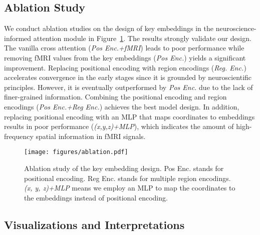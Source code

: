 \subsection{Ablation Study}
We conduct ablation studies on the design of key embeddings in the neuroscience-informed attention module in Figure~\ref{fig:ablation}. The results strongly validate our design. The vanilla cross attention (\textit{Pos Enc.+fMRI}) leads to poor performance while removing fMRI values from the key embeddings (\textit{Pos Enc.}) yields a significant improvement. Replacing positional encoding with region encodings (\textit{Reg. Enc.}) accelerates convergence in the early stages since it is grounded by neuroscientific principles. However, it is eventually outperformed by \textit{Pos Enc.} due to the lack of finer-grained information. Combining the positional encoding and region encodings (\textit{Pos Enc.+Reg Enc.}) achieves the best model design. In addition, replacing positional encoding with an MLP that maps coordinates to embeddings results in poor performance (\textit{(x,y,z)+MLP}), which indicates the amount of high-frequency spatial information in fMRI signals.

\begin{figure}[h]
\vspace{-0.8em}
    \centering
    \texttt{[image: figures/ablation.pdf]}
    \vspace{-2em}
    \caption{Ablation study of the key embedding design. Pos Enc. stands for positional encoding. Reg Enc. stands for multiple region encodings. \textit{(x, y, z)+MLP} means we employ an MLP to map the coordinates to the embeddings instead of positional encoding.}
    \label{fig:ablation}
    \vspace{-1.3em}
\end{figure}
\subsection{Visualizations and Interpretations}
\label{sec:vis}




